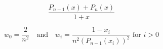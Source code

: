 \documentclass{article}
\begin{document}
\[ \frac{P_{n-1}(x)+P_n(x)}{1+x} \]
\pagebreak

\[ w_0=\frac{2}{n^2}\quad\text{and} \quad w_i=\frac{1-x_i}{n^2(P_{n-1}(x_i))^2}\text{ for }i>0 \]
\pagebreak
\end{document}
